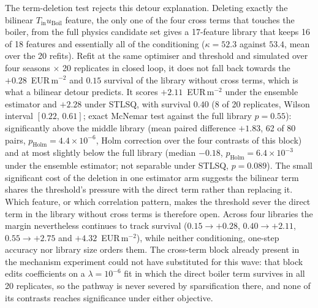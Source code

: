 The term-deletion test rejects this detour explanation. Deleting exactly the bilinear
$T_{\text{in}}u_{\text{Boil}}$ feature, the only one of the four cross terms that touches the boiler, from the full physics candidate set gives a 17-feature library
that keeps 16 of 18 features and essentially all of the conditioning
($\kappa = 52.3$ against $53.4$, mean over the 20 refits). Refit at the same
optimiser and threshold and simulated over four seasons $\times$ 20 replicates in
closed loop, it does not fall back towards the $+0.28$~EUR\,m$^{-2}$ and $0.15$
survival of the library without cross terms, which is what a bilinear detour
predicts. It scores $+2.11$~EUR\,m$^{-2}$ under the ensemble estimator and $+2.28$
under STLSQ, with survival $0.40$ (8 of 20 replicates, Wilson interval
$[0.22,\,0.61]$; exact McNemar test against the full library $p = 0.55$):
significantly above the middle library (mean paired difference $+1.83$, 62 of 80
pairs, $p_{\text{Holm}} = 4.4\times10^{-6}$, Holm correction over the four
contrasts of this block) and at most slightly below the full library (median
$-0.18$, $p_{\text{Holm}} = 6.4\times10^{-3}$ under the ensemble estimator; not
separable under STLSQ, $p = 0.089$). The small significant cost of the deletion in
one estimator arm suggests the bilinear term shares the threshold's pressure with
the direct term rather than replacing it. Which feature, or which correlation
pattern, makes the threshold sever the direct term in the library without cross
terms is therefore open. Across four libraries the margin nevertheless continues to track
survival ($0.15 \rightarrow +0.28$, $0.40 \rightarrow +2.11$,
$0.55 \rightarrow +2.75$ and $+4.32$~EUR\,m$^{-2}$), while neither conditioning,
one-step accuracy nor library size orders them. The cross-term block already
present in the mechanism experiment could not have substituted for this wave: that
block edits coefficients on a $\lambda=10^{-6}$ fit in which the direct boiler term
survives in all 20 replicates, so the pathway is never severed by sparsification
there, and none of its contrasts reaches significance under either objective.

